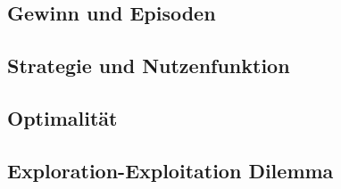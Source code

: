 \documentclass[12pt]{article}
\numberwithin{equation}{section}
\begin{document}
	\subsection{Gewinn und Episoden}
	

	\subsection{Strategie und Nutzenfunktion}
	

	\subsection{Optimalität}
	

	\subsection{Exploration-Exploitation Dilemma}
	



\pagebreak


\end{document}
